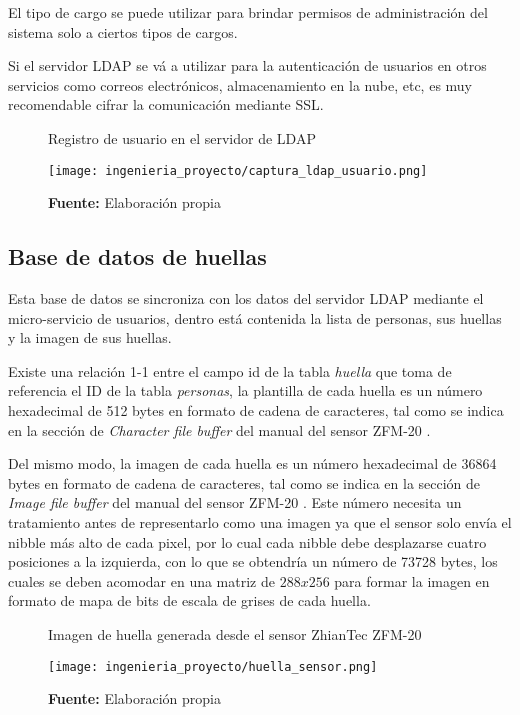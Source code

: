 \documentclass[../principal]{subfiles}
\begin{document}
  El tipo de cargo se puede utilizar para brindar permisos de administración del sistema solo a ciertos tipos de cargos.

  Si el servidor LDAP se vá a utilizar para la autenticación de usuarios en otros servicios como correos electrónicos, almacenamiento en la nube, etc, es muy recomendable cifrar la comunicación mediante SSL.

  \begin{figure}[H]
    \centering
    \caption{Registro de usuario en el servidor de LDAP}
    \texttt{[image: ingenieria\_proyecto/captura\_ldap\_usuario.png]}
    \caption*{\textbf{Fuente:} Elaboración propia}
  \end{figure}

  \subsection{Base de datos de huellas}

  Esta base de datos se sincroniza con los datos del servidor LDAP mediante el micro-servicio de usuarios, dentro está contenida la lista de personas, sus huellas y la imagen de sus huellas.

  Existe una relación 1-1 entre el campo id de la tabla \textit{huella} que toma de referencia el ID de la tabla \textit{personas}, la plantilla de cada huella es un número hexadecimal de 512 bytes en formato de cadena de caracteres, tal como se indica en la sección de \textit{Character file buffer} del manual del sensor ZFM-20 \cite{manual:fingerprint_ZFM-20}.

  Del mismo modo, la imagen de cada huella es un número hexadecimal de 36864 bytes en formato de cadena de caracteres, tal como se indica en la sección de \textit{Image file buffer} del manual del sensor ZFM-20 \cite{manual:fingerprint_ZFM-20}. Este número necesita un tratamiento antes de representarlo como una imagen ya que el sensor solo envía el nibble más alto de cada pixel, por lo cual cada nibble debe desplazarse cuatro posiciones a la izquierda, con lo que se obtendría un número de 73728 bytes, los cuales se deben acomodar en una matriz de $ 288 x 256 $ para formar la imagen en formato de mapa de bits de escala de grises de cada huella.

  \begin{figure}[H]
    \centering
    \caption{Imagen de huella generada desde el sensor ZhianTec ZFM-20}
    \texttt{[image: ingenieria\_proyecto/huella\_sensor.png]}
    \caption*{\textbf{Fuente:} Elaboración propia}
  \end{figure}
  
\end{document}
